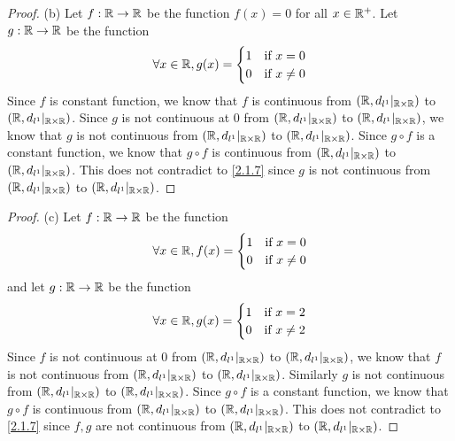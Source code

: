 \begin{proof}{(b)}
  Let \(f : \mathbb{R} \to \mathbb{R}\) be the function \(f(x) = 0\) for all \(x \in \mathbb{R}^+\).
  Let \(g : \mathbb{R} \to \mathbb{R}\) be the function
  \[
    \forall x \in \mathbb{R}, g(x) = \begin{cases}
      1 & \text{if } x = 0    \\
      0 & \text{if } x \neq 0
    \end{cases}
  \]
  Since \(f\) is constant function, we know that \(f\) is continuous from \((\mathbb{R}, d_{l^1}|_{\mathbb{R} \times \mathbb{R}})\) to \((\mathbb{R}, d_{l^1}|_{\mathbb{R} \times \mathbb{R}})\).
  Since \(g\) is not continuous at \(0\) from \((\mathbb{R}, d_{l^1}|_{\mathbb{R} \times \mathbb{R}})\) to \((\mathbb{R}, d_{l^1}|_{\mathbb{R} \times \mathbb{R}})\), we know that \(g\) is not continuous from \((\mathbb{R}, d_{l^1}|_{\mathbb{R} \times \mathbb{R}})\) to \((\mathbb{R}, d_{l^1}|_{\mathbb{R} \times \mathbb{R}})\).
  Since \(g \circ f\) is a constant function, we know that \(g \circ f\) is continuous from \((\mathbb{R}, d_{l^1}|_{\mathbb{R} \times \mathbb{R}})\) to \((\mathbb{R}, d_{l^1}|_{\mathbb{R} \times \mathbb{R}})\).
  This does not contradict to \cref{2.1.7} since \(g\) is not continuous from \((\mathbb{R}, d_{l^1}|_{\mathbb{R} \times \mathbb{R}})\) to \((\mathbb{R}, d_{l^1}|_{\mathbb{R} \times \mathbb{R}})\).
\end{proof}

\begin{proof}{(c)}
  Let \(f : \mathbb{R} \to \mathbb{R}\) be the function
  \[
    \forall x \in \mathbb{R}, f(x) = \begin{cases}
      1 & \text{if } x = 0    \\
      0 & \text{if } x \neq 0
    \end{cases}
  \]
  and let \(g : \mathbb{R} \to \mathbb{R}\) be the function
  \[
    \forall x \in \mathbb{R}, g(x) = \begin{cases}
      1 & \text{if } x = 2    \\
      0 & \text{if } x \neq 2
    \end{cases}
  \]
  Since \(f\) is not continuous at \(0\) from \((\mathbb{R}, d_{l^1}|_{\mathbb{R} \times \mathbb{R}})\) to \((\mathbb{R}, d_{l^1}|_{\mathbb{R} \times \mathbb{R}})\), we know that \(f\) is not continuous from \((\mathbb{R}, d_{l^1}|_{\mathbb{R} \times \mathbb{R}})\) to \((\mathbb{R}, d_{l^1}|_{\mathbb{R} \times \mathbb{R}})\).
  Similarly \(g\) is not continuous from \((\mathbb{R}, d_{l^1}|_{\mathbb{R} \times \mathbb{R}})\) to \((\mathbb{R}, d_{l^1}|_{\mathbb{R} \times \mathbb{R}})\).
  Since \(g \circ f\) is a constant function, we know that \(g \circ f\) is continuous from \((\mathbb{R}, d_{l^1}|_{\mathbb{R} \times \mathbb{R}})\) to \((\mathbb{R}, d_{l^1}|_{\mathbb{R} \times \mathbb{R}})\).
  This does not contradict to \cref{2.1.7} since \(f, g\) are not continuous from \((\mathbb{R}, d_{l^1}|_{\mathbb{R} \times \mathbb{R}})\) to \((\mathbb{R}, d_{l^1}|_{\mathbb{R} \times \mathbb{R}})\).
\end{proof}

